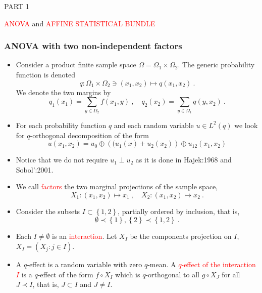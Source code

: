 \documentclass[xcolor=svgnames]{beamer}
\newcommand{\rosso}[1]{\textcolor{red}{#1}}
\newcommand{\set}[1]{\left\{#1\right\}}
\renewcommand{\emph}{\rosso}
\begin{document}
\begin{frame}[plain]

  \huge PART 1

  \bigskip
  \Large \emph{ANOVA} and \emph{AFFINE STATISTICAL BUNDLE}
    
\end{frame}

    \begin{frame}\small\frametitle{ANOVA with two non-independent factors}

    \begin{itemize}
    \item Consider a product finite sample space $\Omega = \Omega_1 \times \Omega_2$. The generic probability function is denoted
    \begin{equation*}
       q \colon  \Omega_1 \times \Omega _2 \ni (x_1,x_2) \mapsto q(x_1,x_2) \ . 
    \end{equation*}
    We denote the two margins by 
    \begin{equation*}
    q_1(x_1) = \sum_{y \in \Omega_2} f(x_1,y) \ , \quad q_2(x_2) = \sum_{y \in \Omega_1} q(y,x_2) \ .
    \end{equation*}
    \item For each probability function $q$ and each random variable $u \in L^2(q)$ we look for $q$-orthogonal decomposition of the form
    \begin{equation*}
        u(x_1,x_2) = u_0 \oplus \left((u_1(x) + u_2(x_2)\right) \oplus u_{12}(x_1,x_2)
    \end{equation*}
    \item Notice that we do not require $u_1 \perp u_2$ as it is done in Hajek:1968 and Sobol':2001.
    \item We call \emph{factors} the two marginal projections of the sample space,
\begin{equation*}
    X_1 \colon (x_1,x_2) \mapsto x_1 \ , \quad X_2 \colon (x_1,x_2) \mapsto x_2 \ .  
    \end{equation*}
  \item Consider the subsets $I \subset \set{1,2}$, partially ordered by inclusion, that is, 
\begin{equation*}\emptyset \prec \set{1},\set{2} \prec \set{1,2} \ .
\end{equation*}
\item  Each $I \neq \emptyset$ is an \emph{interaction}. 
   Let $X_I$ be the components projection on $I$, $X_I = (X_j \colon j \in I)$.
    \item A $q$-effect is a random variable with zero $q$-mean. A \emph{$q$-effect of the interaction $I$} is a $q$-effect of the form $f\circ X_I$ which is $q$-orthogonal to all $g \circ X_J$ for all $J \prec I$, that is, $J \subset I$ and $J \neq I$.

\end{itemize}
\end{frame}
\end{document}
